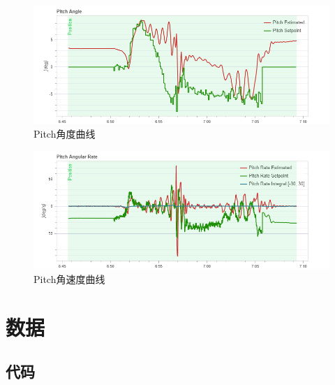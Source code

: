 \begin{figure}[H]
    \centering
    \includegraphics[width=0.8\linewidth]{./Figure/Pitch_Angle_Plot.png}
    \caption{Pitch角度曲线}\label{Fig:append_img12}
\end{figure}

\begin{figure}[H]
    \centering
    \includegraphics[width=0.8\linewidth]{./Figure/Pitch_Angular_Plot.png}
    \caption{Pitch角速度曲线}\label{Fig:append_img13}
\end{figure}

\chapter{数据}

\section{代码}




